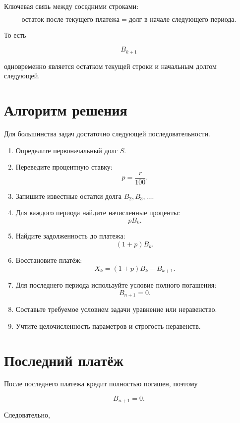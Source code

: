 \documentclass[a4paper,12pt]{article}
\begin{document}
Ключевая связь между соседними строками:

\[
\boxed{\text{остаток после текущего платежа}
=
\text{долг в начале следующего периода}.}
\]

То есть

\[
B_{k+1}
\]

одновременно является остатком текущей строки и начальным долгом следующей.


\section{Алгоритм решения}

Для большинства задач достаточно следующей последовательности.

\begin{enumerate}[leftmargin=1.8em,itemsep=0.45em]
    \item Определите первоначальный долг \(S\).
    \item Переведите процентную ставку:
    \[
    p=\frac{r}{100}.
    \]
    \item Запишите известные остатки долга \(B_2,B_3,\ldots\).
    \item Для каждого периода найдите начисленные проценты:
    \[
    pB_k.
    \]
    \item Найдите задолженность до платежа:
    \[
    (1+p)B_k.
    \]
    \item Восстановите платёж:
    \[
    X_k=(1+p)B_k-B_{k+1}.
    \]
    \item Для последнего периода используйте условие полного погашения:
    \[
    B_{n+1}=0.
    \]
    \item Составьте требуемое условием задачи уравнение или неравенство.
    \item Учтите целочисленность параметров и строгость неравенств.
\end{enumerate}


\section{Последний платёж}

После последнего платежа кредит полностью погашен, поэтому

\[
B_{n+1}=0.
\]

Следовательно,
\end{document}
